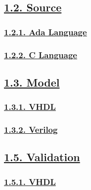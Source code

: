 \documentclass[
]{article}
\begin{document}
\hypertarget{source}{%
\subsection{\texorpdfstring{\protect\hyperlink{source-1}{1.2.
Source}}{1.2. Source}}\label{source}}

\hypertarget{ada-language}{%
\subsubsection{\texorpdfstring{\protect\hyperlink{ada-language-1}{1.2.1.
Ada Language}}{1.2.1. Ada Language}}\label{ada-language}}

\hypertarget{c-language}{%
\subsubsection{\texorpdfstring{\protect\hyperlink{c-language-1}{1.2.2. C
Language}}{1.2.2. C Language}}\label{c-language}}

\hypertarget{model}{%
\subsection{\texorpdfstring{\protect\hyperlink{model-1}{1.3.
Model}}{1.3. Model}}\label{model}}

\hypertarget{vhdl}{%
\subsubsection{\texorpdfstring{\protect\hyperlink{vhdl-3}{1.3.1.
VHDL}}{1.3.1. VHDL}}\label{vhdl}}

\hypertarget{verilog}{%
\subsubsection{\texorpdfstring{\protect\hyperlink{verilog-3}{1.3.2.
Verilog}}{1.3.2. Verilog}}\label{verilog}}

\hypertarget{validation}{%
\subsection{\texorpdfstring{\protect\hyperlink{validation-1}{1.5.
Validation}}{1.5. Validation}}\label{validation}}

\hypertarget{vhdl-1}{%
\subsubsection{\texorpdfstring{\protect\hyperlink{vhdl-5}{1.5.1.
VHDL}}{1.5.1. VHDL}}\label{vhdl-1}}
\end{document}
